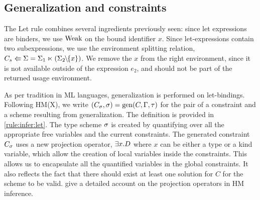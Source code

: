 \subsection{Generalization and constraints}
\label{infer:let}

The {\sc Let} rule combines several ingredients previously seen:
since let expressions are binders, we use $\operatorname{Weak}$ on the bound
identifier $x$. Since let-expressions contain
two subexpressions, we use the environment splitting relation,
$C_s \Lleftarrow \Sigma = \Sigma_1 \ltimes (\Sigma_2 \!\!\mathbin{\setminus}\!\!\{x\})$. We remove the $x$ from
the right environment, since it is not available outside of the expression
$e_2$, and should not be part of the returned usage environment.

As per tradition in ML languages, generalization is performed
on let-bindings.
Following HM(X), we write $(C_\sigma, \sigma) = \operatorname{\text{gen}}(C,\Gamma,\tau)$
for the pair of a constraint and a scheme resulting from
generalization. The definition is provided in \cref{rule:infer:let}.
The type scheme $\sigma$ is created by quantifying over all the appropriate
free variables and the current constraints.
The generated constraint $C_\sigma$ uses a new projection operator,
$\exists x.D$ where $x$ can be either a type or a kind variable, which
allow the creation of local variables inside the constraints.
This allows us to encapsulate all the quantified variables in the global constraints.
It also reflects the fact that there
should exist at least one solution for $C$ for the scheme to be valid.
\citet{DBLP:journals/tapos/OderskySW99} give a detailed account
on the projection operators in HM inference.






